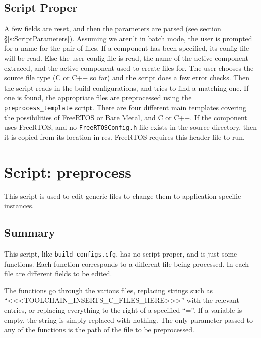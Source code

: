 \documentclass[a4paper, oneside, 11pt, titlepage, onecolumn, openright]{report}
\begin{document}
\subsection{Script Proper}
			\label{ss:crefileScriptProper}
			A few fields are reset, and then the parameters are parsed (see section \S\ref{s:ScriptParameters}). \newline
			Assuming we aren't in batch mode, the user is prompted for a name for the pair of files. If a component has been specified, its config file will be read.\newline
			Else the user config file is read, the name of the active component extraced, and the active component used to create files for.\newline
			The user chooses the source file type (C or C++ so far) and the script does a few error checks.\newline
			Then the script reads in the build configurations, and tries to find a matching one. If one is found, the appropriate files are preprocessed using the \texttt{preprocess\_template} script. There are four different main templates covering the possibilities of FreeRTOS or Bare Metal, and C or C++.\newline
			If the component uses FreeRTOS, and no \texttt{FreeRTOSConfig.h} file exists in the source directory, then it is copied from its location in res. FreeRTOS requires this header file to run.
			
			
\section{Script: preprocess}
			\label{s:Preprocess}
			This script is used to edit generic files to change them to application specific instances.

\subsection{Summary}
			\label{ss:preprocessSummary}
			This script, like \texttt{build\_configs.cfg}, has no script proper, and is just some functions. Each function corresponds to a different file being processed. In each file are different fields to be edited. \newline
			
			The functions go through the various files, replacing strings such as ``<<<TOOLCHAIN\_INSERTS\_C\_FILES\_HERE>>>'' with the relevant entries, or replacing everything to the right of a specified ``=''. If a variable is empty, the string is simply replaced with nothing.\newline
			The only parameter passed to any of the functions is the path of the file to be preprocessed.\newline
			
\end{document}
